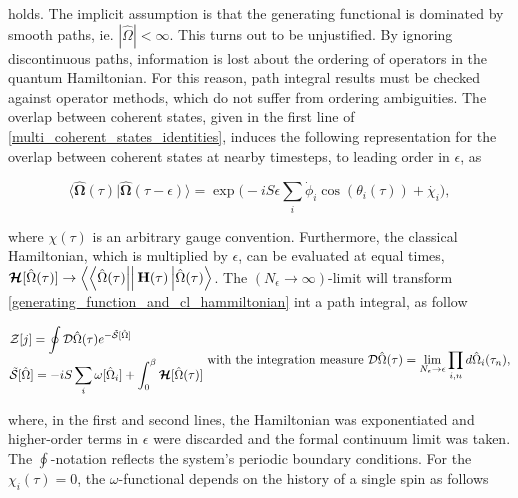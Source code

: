 \documentclass{homework}
\begin{document}
holds. The implicit assumption is that the generating functional is dominated by smooth paths, ie. $|\hat{{\Omega}}| < \infty$. This turns out to be unjustified. By ignoring discontinuous paths, information is lost about the ordering of operators in the quantum Hamiltonian. For this reason, path integral results must be checked against operator methods, which do not suffer from ordering ambiguities. The overlap between coherent states, given in the first line of \cref{multi_coherent_states_identities}, induces the following representation for the overlap between coherent states at nearby timesteps, to leading order in $\epsilon$, as 

\begin{equation}
    \bigg\langle \hat{\bm{\Omega}}(\tau) \bigg| \hat{\bm{\Omega}}(\tau - \epsilon) \bigg\rangle = \exp \bigg(-i S \epsilon \sum_{i} \dot{\phi}_i \cos (\theta_i(\tau)) + \dot{\chi_i}\bigg),
\end{equation}

where $\chi(\tau)$ is an arbitrary gauge convention. Furthermore, the classical Hamiltonian, which is multiplied by $\epsilon$, can be evaluated at equal times, $\bm{\mathcal{H}}[\hat{\Omega}(\tau)] \rightarrow \bra{\bra{\hat{\Omega}(\tau)}} {{\bf H}} (\tau) \ket{\hat{\Omega}(\tau)}$. The $(N_{\epsilon} \rightarrow \infty)$-limit will transform \cref{generating_function_and_cl_hammiltonian} int a path integral, as follow

\begin{equation}
    \begin{split}
        &\mathcal{Z}[j] = \oint \mathcal{D} \hat{\Omega}(\tau) e^{- \tilde{\mathcal{S}}[\hat{\Omega}]} \\
        & \tilde{\mathcal{S}}[\hat{\Omega}] = -iS \sum_{i} \omega[\hat{\Omega}_i] + \int_{0}^{\beta} \bm{\mathcal{H}}[\hat{\Omega}(\tau)]
    \end{split} \textnormal{ with the integration measure } \mathcal{D} \hat{\Omega}(\tau) = \lim_{N_{\epsilon}\rightarrow \epsilon} \prod_{i,n}  d \hat{\Omega}_i(\tau_n),
    \label{spin_wave_theoretic_wave_generating_func_and_phase_func}
\end{equation}

where, in the first and second lines, the Hamiltonian was exponentiated and higher-order terms in $\epsilon$ were discarded and the formal continuum limit was taken. The $\oint$-notation reflects the system's periodic boundary conditions. For the $\chi_i(\tau) = 0$, the $\omega$-functional depends on the history of a single spin as follows
\end{document}

